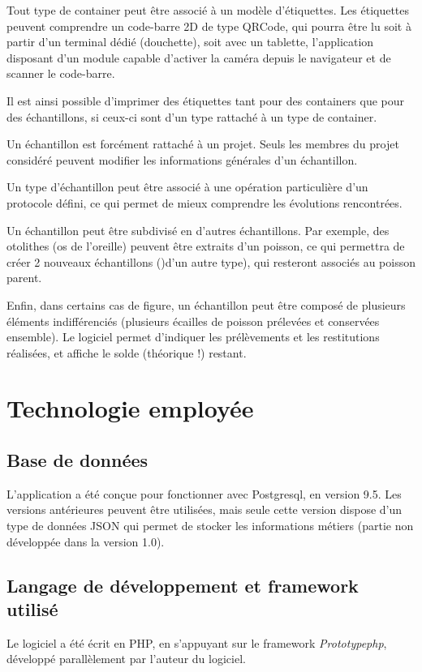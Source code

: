 Tout type de container peut être associé à un modèle d'étiquettes. Les étiquettes peuvent comprendre un code-barre 2D de type QRCode, qui pourra être lu soit à partir d'un terminal dédié (douchette), soit avec un tablette, l'application disposant d'un module capable d'activer la caméra depuis le navigateur et de scanner le code-barre.

Il est ainsi possible d'imprimer des étiquettes tant pour des containers que pour des échantillons, si ceux-ci sont d'un type rattaché à un type de container.

Un échantillon est forcément rattaché à un projet. Seuls les membres du projet considéré peuvent modifier les informations générales d'un échantillon. 

Un type d'échantillon peut être associé à une opération particulière d'un protocole défini, ce qui permet de mieux comprendre les évolutions rencontrées.

Un échantillon peut être subdivisé en d'autres échantillons. Par exemple, des otolithes (os de l'oreille) peuvent être extraits d'un poisson, ce qui permettra de créer 2 nouveaux échantillons ()d'un autre type), qui resteront associés au poisson parent.

Enfin, dans certains cas de figure, un échantillon peut être composé de plusieurs éléments indifférenciés (plusieurs écailles de poisson prélevées et conservées ensemble). Le logiciel permet d'indiquer les prélèvements et les restitutions réalisées, et affiche le solde (théorique !) restant.

\section{Technologie employée}
\subsection{Base de données}

L'application a été conçue pour fonctionner avec Postgresql, en version 9.5. Les versions antérieures peuvent être utilisées, mais seule cette version dispose d'un type de données JSON qui permet de stocker les informations métiers (partie non  développée dans la version 1.0).

\subsection{Langage de développement et framework utilisé}
Le logiciel a été écrit en PHP, en s'appuyant sur le framework \textit{Prototypephp}, développé parallèlement par l'auteur du logiciel.

